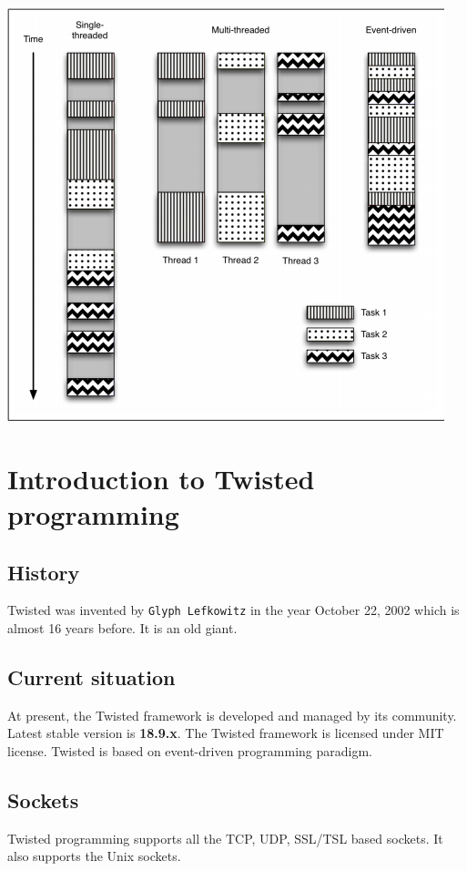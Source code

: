 \documentclass{article}
\begin{document}
    \includegraphics{event_driven_comparision.png}

  \section{Introduction to Twisted programming}

    \subsection{History}
      Twisted was invented by \texttt{Glyph Lefkowitz} in the year October 22,
      2002 which is almost 16 years before. It is an old giant.

    \subsection{Current situation}
      At present, the Twisted framework is developed and managed by its
      community. Latest stable version is \textbf{18.9.x}. The Twisted
      framework is licensed under MIT license. Twisted is based on event-driven
      programming paradigm.

    \subsection{Sockets}
      Twisted programming supports all the TCP, UDP, SSL/TSL based sockets. It
      also supports the Unix sockets.
\end{document}
